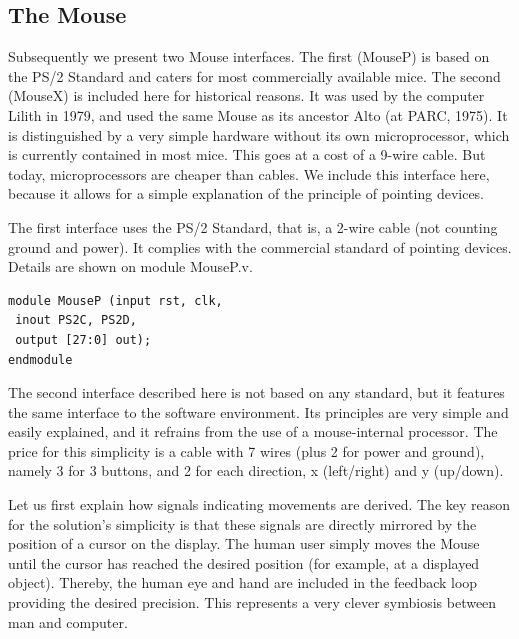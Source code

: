 \subsection{The Mouse}
Subsequently we present two Mouse interfaces. The first (MouseP) is based on the PS/2 Standard
and caters for most commercially available mice. The second (MouseX) is included here for
historical reasons. It was used by the computer Lilith in 1979, and used the same Mouse as its
ancestor Alto (at PARC, 1975). It is distinguished by a very simple hardware without its own
microprocessor, which is currently contained in most mice. This goes at a cost of a 9-wire cable.
But today, microprocessors are cheaper than cables. We include this interface here, because it
allows for a simple explanation of the principle of pointing devices.

The first interface uses the PS/2 Standard, that is, a 2-wire cable (not counting ground and power).
It complies with the commercial standard of pointing devices. Details are shown on module
MouseP.v.
\begin{verbatim}
module MouseP (input rst, clk,
 inout PS2C, PS2D,
 output [27:0] out);
endmodule
\end{verbatim}

The second interface described here is not based on any standard, but it features the same
interface to the software environment. Its principles are very simple and easily explained, and it
refrains from the use of a mouse-internal processor. The price for this simplicity is a cable with 7
wires (plus 2 for power and ground), namely 3 for 3 buttons, and 2 for each direction, x (left/right)
and y (up/down).

Let us first explain how signals indicating movements are derived. The key reason for the solution's
simplicity is that these signals are directly mirrored by the position of a cursor on the display. The
human user simply moves the Mouse until the cursor has reached the desired position (for
example, at a displayed object). Thereby, the human eye and hand are included in the feedback
loop providing the desired precision. This represents a very clever symbiosis between man and
computer.

